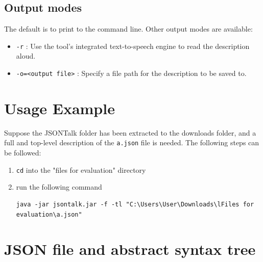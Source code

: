 \documentclass{l4proj}
\begin{document}
\begin{appendices}
\subsection{Output modes}

The default is to print to the command line. Other output modes are available:

\begin{itemize}
\item \verb|-r| : Use the tool's integrated text-to-speech engine to read the description aloud.
\item \verb|-o=<output file>| : Specify a file path for the description to be saved to.
\end{itemize}

\section{Usage Example}

Suppose the JSONTalk folder has been extracted to the downloads folder, and a full and top-level description of the \verb|a.json| file is needed. The following steps can be followed:

\begin{enumerate}
\item \verb|cd| into the "files for evaluation" directory
\item run the following command

\begin{verbatim}
java -jar jsontalk.jar -f -tl "C:\Users\User\Downloads\lFiles for evaluation\a.json"
\end{verbatim}

\end{enumerate}

\pagebreak

\section{JSON file and abstract syntax tree}
\label{appendix:AST}


\end{appendices}
\end{document}
